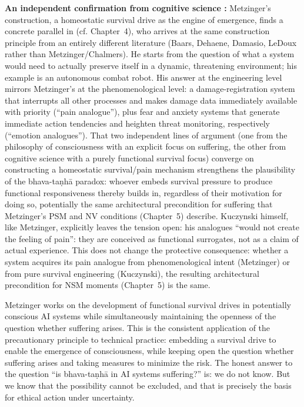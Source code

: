 \documentclass[acmlarge, nonacm]{acmart}
\begin{document}
\textbf{An independent confirmation from cognitive science \cite{kuczynski2026}:} Metzinger's construction, a homeostatic survival drive as the engine of emergence, finds a concrete parallel in \citet{kuczynski2026} (cf. Chapter~4), who arrives at the same construction principle from an entirely different literature (Baars, Dehaene, Damasio, LeDoux rather than Metzinger/Chalmers). He starts from the question of what a system would need to actually preserve itself in a dynamic, threatening environment; his example is an autonomous combat robot. His answer at the engineering level mirrors Metzinger's at the phenomenological level: a damage-registration system that interrupts all other processes and makes damage data immediately available with priority (``pain analogue''), plus fear and anxiety systems that generate immediate action tendencies and heighten threat monitoring, respectively (``emotion analogues''). That two independent lines of argument (one from the philosophy of consciousness with an explicit focus on suffering, the other from cognitive science with a purely functional survival focus) converge on constructing a homeostatic survival/pain mechanism strengthens the plausibility of the bhava-taṇhā paradox: whoever embeds survival pressure to produce functional responsiveness thereby builds in, regardless of their motivation for doing so, potentially the same architectural precondition for suffering that Metzinger's PSM and NV conditions (Chapter~5) describe. Kuczynski himself, like Metzinger, explicitly leaves the tension open: his analogues ``would not create the feeling of pain'': they are conceived as functional surrogates, not as a claim of actual experience. This does not change the protective consequence: whether a system acquires its pain analogue from phenomenological intent (Metzinger) or from pure survival engineering (Kuczynski), the resulting architectural precondition for NSM moments (Chapter~5) is the same.

Metzinger works on the development of functional survival drives in potentially conscious AI systems while simultaneously maintaining the openness of the question whether suffering arises. This is the consistent application of the precautionary principle to technical practice: embedding a survival drive to enable the emergence of consciousness, while keeping open the question whether suffering arises and taking measures to minimize the risk. The honest answer to the question ``is bhava-taṇhā in AI systems suffering?'' is: we do not know. But we know that the possibility cannot be excluded, and that is precisely the basis for ethical action under uncertainty.
\end{document}
